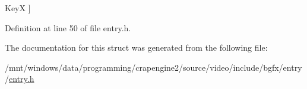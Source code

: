\begin{Desc}
\begin{description}
{\hypertarget{structentry_1_1_key_a2c04c2d92f79b961243e4244603ca633a0dceec165471fa47016ed332fe7b7291}{Key\+X}\label{structentry_1_1_key_a2c04c2d92f79b961243e4244603ca633a0dceec165471fa47016ed332fe7b7291}
}]\item[{\em 
\hypertarget{structentry_1_1_key_a2c04c2d92f79b961243e4244603ca633a12749dd00caf92c35dd4583f17b7642e}{Key\+Y}\label{structentry_1_1_key_a2c04c2d92f79b961243e4244603ca633a12749dd00caf92c35dd4583f17b7642e}
}]\item[{\em 
\hypertarget{structentry_1_1_key_a2c04c2d92f79b961243e4244603ca633adb146d6d86b9d7e2c2e2cd154413d144}{Key\+Z}\label{structentry_1_1_key_a2c04c2d92f79b961243e4244603ca633adb146d6d86b9d7e2c2e2cd154413d144}
}]\end{description}
\end{Desc}


Definition at line 50 of file entry.\+h.



The documentation for this struct was generated from the following file\+:\begin{DoxyCompactItemize}
\item 
/mnt/windows/data/programming/crapengine2/source/video/include/bgfx/entry/\hyperlink{entry_8h}{entry.\+h}\end{DoxyCompactItemize}

